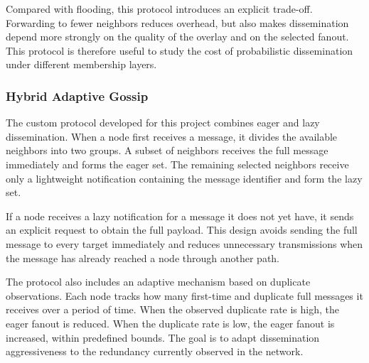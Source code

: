 \documentclass[sigconf,a4paper]{acmart}
\begin{document}
Compared with flooding, this protocol introduces an explicit trade-off.
Forwarding to fewer neighbors reduces overhead, but also makes
dissemination depend more strongly on the quality of the overlay and on
the selected fanout. This protocol is therefore useful to study the cost
of probabilistic dissemination under different membership layers.

\subsubsection{Hybrid Adaptive Gossip}

The custom protocol developed for this project combines eager and lazy
dissemination. When a node first receives a message, it divides the
available neighbors into two groups. A subset of neighbors receives the
full message immediately and forms the eager set. The remaining selected
neighbors receive only a lightweight notification containing the message
identifier and form the lazy set.

If a node receives a lazy notification for a message it does not yet
have, it sends an explicit request to obtain the full payload. This
design avoids sending the full message to every target immediately and
reduces unnecessary transmissions when the message has already reached a
node through another path.

The protocol also includes an adaptive mechanism based on duplicate
observations. Each node tracks how many first-time and duplicate full
messages it receives over a period of time. When the observed duplicate
rate is high, the eager fanout is reduced. When the duplicate rate is
low, the eager fanout is increased, within predefined bounds. The goal
is to adapt dissemination aggressiveness to the redundancy currently
observed in the network.
\end{document}
